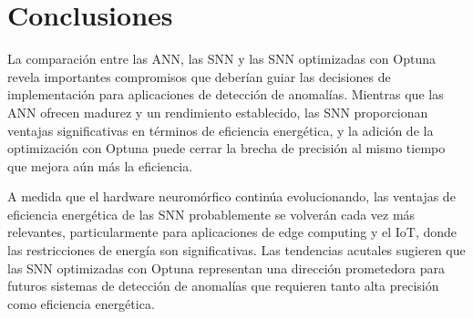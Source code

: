 \section{Conclusiones}

La comparación entre las ANN, las SNN y las SNN optimizadas con Optuna revela importantes compromisos que deberían guiar las decisiones de implementación para aplicaciones de detección de anomalías. Mientras que las ANN ofrecen madurez y un rendimiento establecido, las SNN proporcionan ventajas significativas en términos de eficiencia energética, y la adición de la optimización con Optuna puede cerrar la brecha de precisión al mismo tiempo que mejora aún más la eficiencia.

A medida que el hardware neuromórfico continúa evolucionando, las ventajas de eficiencia energética de las SNN probablemente se volverán cada vez más relevantes, particularmente para aplicaciones de edge computing y el IoT, donde las restricciones de energía son significativas. Las tendencias acutales sugieren que las SNN optimizadas con Optuna representan una dirección prometedora para futuros sistemas de detección de anomalías que requieren tanto alta precisión como eficiencia energética.
